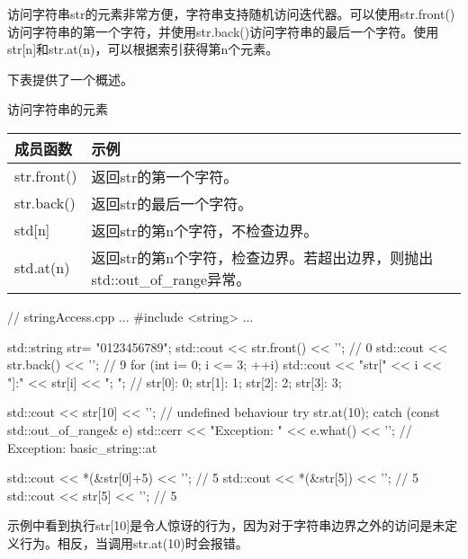 访问字符串str的元素非常方便，字符串支持随机访问迭代器。可以使用str.front()访问字符串的第一个字符，并使用str.back()访问字符串的最后一个字符。使用str[n]和str.at(n)，可以根据索引获得第n个元素。

下表提供了一个概述。

\begin{center}
访问字符串的元素
\end{center}

\begin{longtable}[c]{|l|l|}
\hline
\textbf{成员函数} & \textbf{示例}                                                              \\ \hline
\endfirsthead
%
\endhead
%
str.front()               & 返回str的第一个字符。                                           \\ \hline
str.back()                & 返回str的最后一个字符。                                            \\ \hline
std{[}n{]}                & 返回str的第n个字符，不检查边界。 \\ \hline
std.at(n) & 返回str的第n个字符，检查边界。若超出边界，则抛出std::out\_of\_range异常。 \\ \hline
\end{longtable}


\begin{cpp}
// stringAccess.cpp
...
#include <string>
...

std::string str= {"0123456789"};
std::cout << str.front() << '\n'; // 0
std::cout << str.back() << '\n'; // 9
for (int i= 0; i <= 3; ++i){
	std::cout << "str[" << i << "]:" << str[i] << "; ";
} // str[0]: 0; str[1]: 1; str[2]: 2; str[3]: 3;

std::cout << str[10] << '\n'; // undefined behaviour
try{
	str.at(10);
}
catch (const std::out_of_range& e){
	std::cerr << "Exception: " << e.what() << '\n';
} // Exception: basic_string::at

std::cout << *(&str[0]+5) << '\n'; // 5
std::cout << *(&str[5]) << '\n'; // 5
std::cout << str[5] << '\n'; // 5
\end{cpp}

示例中看到执行str[10]是令人惊讶的行为，因为对于字符串边界之外的访问是未定义行为。相反，当调用str.at(10)时会报错。





























